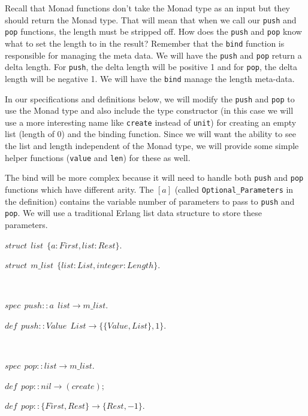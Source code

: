 \documentclass[
]{book}
\begin{document}
Recall that Monad functions don't take the Monad type as an input but they should return the Monad type. That will mean that when we call our \texttt{push} and \texttt{pop} functions, the length must be stripped off. How does the \texttt{push} and \texttt{pop} know what to set the length to in the result? Remember that the \texttt{bind} function is responsible for managing the meta data. We will have the \texttt{push} and \texttt{pop} return a delta length. For \texttt{push}, the delta length will be positive 1 and for \texttt{pop}, the delta length will be negative 1. We will have the \texttt{bind} manage the length meta-data.

In our specifications and definitions below, we will modify the \texttt{push} and \texttt{pop} to use the Monad type and also include the type constructor (in this case we will use a more interesting name like \texttt{create} instead of \texttt{unit}) for creating an empty list (length of 0) and the binding function. Since we will want the ability to see the list and length independent of the Monad type, we will provide some simple helper functions (\texttt{value} and \texttt{len}) for these as well.

The bind will be more complex because it will need to handle both \texttt{push} and \texttt{pop} functions which have different arity. The \([a]\) (called \texttt{Optional\_Parameters} in the definition) contains the variable number of parameters to pass to \texttt{push} and \texttt{pop}. We will use a traditional Erlang list data structure to store these parameters.

\begin{formulabox}
\(struct ~ ~ list ~ ~ \lbrace a:First, list:Rest \rbrace.\)

\(struct ~ ~ m\_list ~ ~ \lbrace list:List, integer:Length \rbrace.\)

\end{formulabox}

\(\nonumber\)

\begin{formulabox}
\(spec ~ ~ push :: a ~ ~ list \rightarrow m\_list.\)

\(de\mathit{f} ~ ~ push :: Value ~ ~ List \rightarrow \lbrace \lbrace Value, List \rbrace, 1\rbrace.\)

\end{formulabox}

\(\nonumber\)

\begin{formulabox}
\(spec ~ ~ pop :: list \rightarrow m\_list.\)

\(de\mathit{f} ~ ~ pop :: nil \rightarrow (create);\)

\(de\mathit{f} ~ ~ pop :: \lbrace First, Rest \rbrace \rightarrow \lbrace Rest, -1 \rbrace.\)

\end{formulabox}
\end{document}
